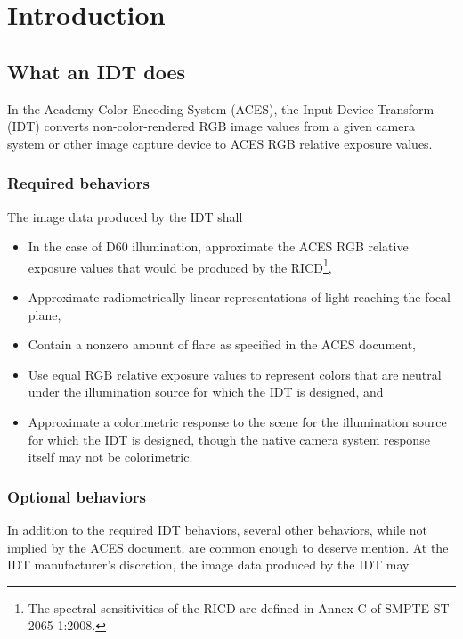 \unnumberedformat	    %
\chapter{Introduction} 	%
    
\section{What an IDT does}
In the Academy Color Encoding System (ACES), the Input Device Transform (IDT) converts non-color-rendered RGB image values from a given camera system or other image capture device to ACES RGB relative exposure values.

\subsection{Required behaviors}
The image data produced by the IDT shall

\begin{itemize}
    \item	In the case of D60 illumination, approximate the ACES RGB relative exposure values that would be produced by the RICD\footnote{The spectral sensitivities of the RICD are defined in Annex C of SMPTE ST 2065-1:2008.},
    \item	Approximate radiometrically linear representations of light reaching the focal plane,
    \item	Contain a nonzero amount of flare as specified in the ACES document,
    \item	Use equal RGB relative exposure values to represent colors that are neutral under the illumination source for which the IDT is designed, and
    \item	Approximate a colorimetric response to the scene for the illumination source for which the IDT is designed, though the native camera system response itself may not be colorimetric.
\end{itemize}

\subsection{Optional behaviors}
In addition to the required IDT behaviors, several other behaviors, while not implied by the ACES document, are common enough to deserve mention. At the IDT manufacturer’s discretion, the image data produced by the IDT may

